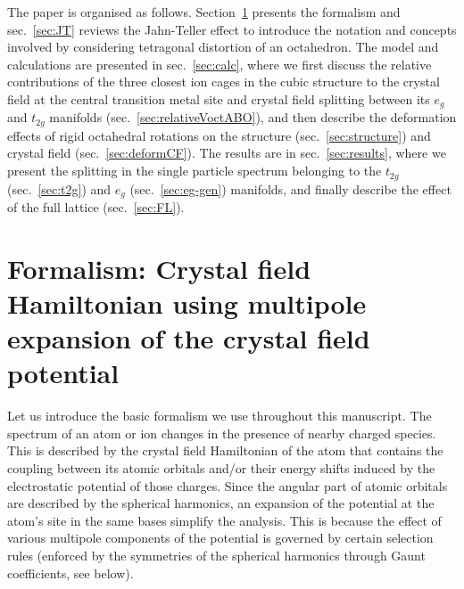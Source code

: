 \documentclass[a4paper,prb,twocolumn]{revtex4-1}  %
\newcommand{\az}[1]{{\color{magenta}{#1}}} %
\begin{document}
The paper is organised as follows.
Section~\ref{sec:formalistm}
presents the formalism and 
sec.~\ref{sec:JT} reviews the Jahn-Teller effect to
introduce the notation and concepts involved
by considering tetragonal distortion of an octahedron.
The model and calculations are presented
in sec.~\ref{sec:calc},
where
we first discuss the relative contributions of the three closest ion cages
in the cubic structure
 to
the crystal field at the central transition metal site 
and crystal field splitting between its $e_g$ and $t_{2g}$ manifolds
(sec.~\ref{sec:relativeVoctABO}),
and then 
describe the deformation effects of 
rigid octahedral rotations %
on
the structure (sec.~\ref{sec:structure}) 
and crystal field (sec.~\ref{sec:deformCF}).
The results are in sec.~\ref{sec:results},
where we %
present the splitting in the single particle spectrum
belonging to the $t_{2g}$ (sec.~\ref{sec:t2g})
and $e_g$ (sec.~\ref{sec:eg-gen}) manifolds,
and finally describe the effect of the full lattice (sec.~\ref{sec:FL}).







 
\section{Formalism: Crystal field Hamiltonian using multipole expansion of the crystal field potential}
\label{sec:formalistm}

Let us introduce the basic formalism we use throughout this manuscript.
The spectrum of an atom or ion
changes in the presence of nearby charged species.
This is described by the crystal field Hamiltonian of the atom
that contains the coupling between its atomic orbitals and/or their energy shifts
induced by the electrostatic potential of those charges.
Since the angular part of atomic orbitals are described by 
the spherical harmonics,
an expansion of the potential at the atom's site 
in the same bases simplify the analysis.
This is because
the effect of various multipole components of the potential
is governed by certain selection rules 
(enforced by the symmetries of the spherical harmonics
through Gaunt coefficients, see below).
\end{document}
